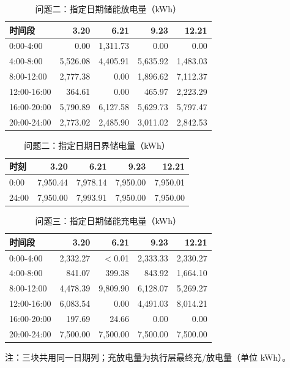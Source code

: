 \begin{table}[htbp]
\centering
\caption{问题二：指定日期储能放电量（kWh）}
\label{tab:q2-b2}
\small
\setlength{\tabcolsep}{4pt}
\begin{tabular}{lrrrr}
\toprule
时间段 & 3.20 & 6.21 & 9.23 & 12.21 \\
\midrule
0:00-4:00 & 0.00 & 1,311.73 & 0.00 & 0.00 \\
4:00-8:00 & 5,526.08 & 4,405.91 & 5,635.92 & 1,483.03 \\
8:00-12:00 & 2,777.38 & 0.00 & 1,896.62 & 7,112.37 \\
12:00-16:00 & 364.61 & 0.00 & 465.97 & 2,223.29 \\
16:00-20:00 & 5,790.89 & 6,127.58 & 5,629.73 & 5,797.47 \\
20:00-24:00 & 2,773.02 & 2,485.90 & 3,011.02 & 2,842.53 \\
\bottomrule
\end{tabular}
\end{table}
\begin{table}[htbp]
\centering
\caption{问题二：指定日期日界储电量（kWh）}
\label{tab:q2-b3}
\small
\setlength{\tabcolsep}{4pt}
\begin{tabular}{lrrrr}
\toprule
时刻 & 3.20 & 6.21 & 9.23 & 12.21 \\
\midrule
0:00 & 7,950.44 & 7,978.14 & 7,950.00 & 7,950.01 \\
24:00 & 7,950.00 & 7,993.91 & 7,950.00 & 7,950.00 \\
\bottomrule
\end{tabular}
\end{table}
\begin{table}[htbp]
\centering
\caption{问题三：指定日期储能充电量（kWh）}
\label{tab:q3-b1}
\small
\setlength{\tabcolsep}{4pt}
\begin{tabular}{lrrrr}
\toprule
时间段 & 3.20 & 6.21 & 9.23 & 12.21 \\
\midrule
0:00-4:00 & 2,332.27 & $<$0.01 & 2,333.33 & 2,330.27 \\
4:00-8:00 & 841.07 & 399.38 & 843.92 & 1,664.10 \\
8:00-12:00 & 4,478.39 & 9,809.90 & 6,128.07 & 5,269.27 \\
12:00-16:00 & 6,083.54 & 0.00 & 4,491.03 & 8,014.21 \\
16:00-20:00 & 197.69 & 24.66 & 0.00 & 0.00 \\
20:00-24:00 & 7,500.00 & 7,500.00 & 7,500.00 & 7,500.00 \\
\bottomrule
\end{tabular}
\vspace{2pt}
\begin{flushleft}\footnotesize 注：三块共用同一日期列；充放电量为执行层最终充/放电量（单位 kWh）。\end{flushleft}
\end{table}
